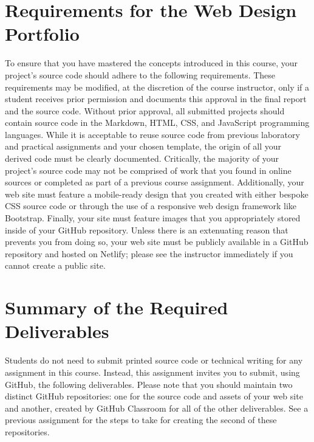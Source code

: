\documentclass[11pt]{article}
\begin{document}
\section*{Requirements for the Web Design Portfolio}

To ensure that you have mastered the concepts introduced in this course, your
project's source code should adhere to the following requirements. These
requirements may be modified, at the discretion of the course instructor, only
if a student receives prior permission and documents this approval in the final
report and the source code. Without prior approval, all submitted projects
should contain source code in the Markdown, HTML, CSS, and JavaScript
programming languages.
%
While it is acceptable to reuse source code from previous laboratory and
practical assignments and your chosen template, the origin of all your derived
code must be clearly documented. Critically, the majority of your project's
source code may not be comprised of work that you found in online sources or
completed as part of a previous course assignment.
%
Additionally, your web site must feature a mobile-ready design that you created
with either bespoke CSS source code or through the use of a responsive web
design framework like Bootstrap. Finally, your site must feature images that you
appropriately stored inside of your GitHub repository.
%
Unless there is an extenuating reason that prevents you from doing so, your web
site must be publicly available in a GitHub repository and hosted on Netlify;
please see the instructor immediately if you cannot create a public site.

\section*{Summary of the Required Deliverables}

\noindent Students do not need to submit printed source code or technical
writing for any assignment in this course. Instead, this assignment invites you
to submit, using GitHub, the following deliverables.
%
Please note that you should maintain two distinct GitHub repositories: one for
the source code and assets of your web site and another, created by GitHub
Classroom for all of the other deliverables.
%
See a previous assignment for the steps to take for creating the second of these
repositories.

\vspace*{-0.05in}
\end{document}
